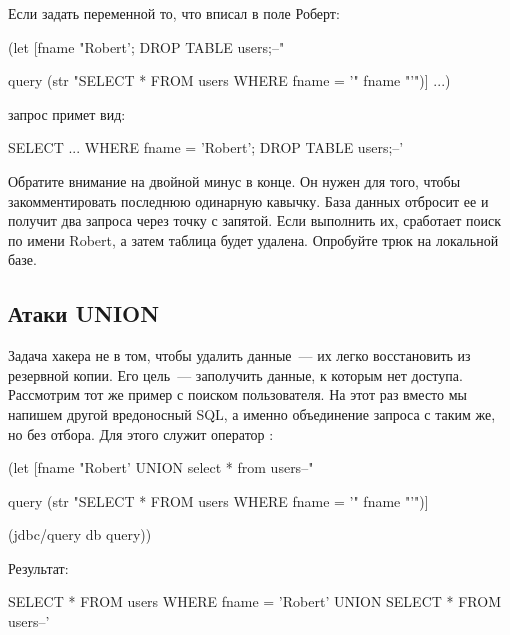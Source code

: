 Если задать переменной  то, что вписал в поле Роберт:

\begin{english}
  \begin{clojure}
(let [fname
      "Robert'; DROP TABLE users;--"

      query
      (str "SELECT * FROM users WHERE fname = '"
           fname
           "'")]
  ...)
  \end{clojure}
\end{english}

\noindent
запрос примет вид:

\begin{english}
  \begin{sql}
SELECT ... WHERE fname = 'Robert'; DROP TABLE users;--'
  \end{sql}
\end{english}

Обратите внимание на двойной минус в конце. Он нужен для того, чтобы закомментировать последнюю одинарную кавычку. База данных отбросит ее и получит два запроса через точку с запятой. Если выполнить их, сработает поиск по имени Robert, а затем таблица  будет удалена. Опробуйте трюк на локальной базе.

\subsection{Атаки UNION}


Задача хакера не в том, чтобы удалить данные~--- их легко восстановить из резервной копии. Его цель~--- заполучить данные, к которым нет доступа. Рассмотрим тот же пример с поиском пользователя. На этот раз вместо  мы напишем другой вредоносный SQL, а именно объединение запроса с таким же, но без отбора. Для этого служит оператор :

\begin{english}
  \begin{clojure}
(let [fname
      "Robert' UNION select * from users--"

      query
      (str "SELECT * FROM users WHERE fname = '"
           fname
           "'")]

  (jdbc/query db query))
  \end{clojure}
\end{english}

Результат:

\begin{english}
  \begin{sql}
SELECT * FROM users WHERE fname = 'Robert'
UNION
SELECT * FROM users--'
  \end{sql}
\end{english}

